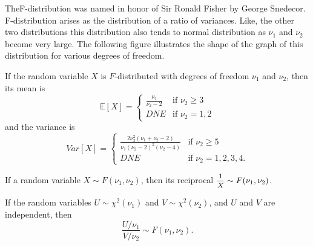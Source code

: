 TheF-distribution was named in honor of Sir Ronald Fisher by George
Snedecor. F-distribution arises as the distribution of a ratio of variances.
Like, the other two distributions this distribution also tends to normal 
distribution as $\nu_1$ and $\nu_2$ become very large. The
following figure illustrates the
 shape of the graph of this distribution for various degrees of freedom.

\begin{theorem}
If the random variable $X$ is $F$-distributed with degrees 
of freedom $\nu_1$ and $\nu_2$, then its mean is 
\begin{equation}
    \mathbb{E}[X] = \begin{cases}
        \displaystyle \frac{\nu_2}{\nu_2 - 2} & \text{if } \nu_2 \geq 3\\
        DNE & \text{if } \nu_2 = 1,2
    \end{cases}
\end{equation}
and the variance is 
\begin{equation}
    Var[X] = \begin{cases}
        \displaystyle \frac{2\nu^2_2 (\nu_1 + \nu_2 - 2)}{\nu_1 (\nu_2 - 2)^2 (\nu_2 - 4)} & \text{if } \nu_2 \geq 5\\
        DNE & \text{if } \nu_2 = 1,2,3,4.
    \end{cases}
\end{equation}
\end{theorem}

\begin{theorem}
    If a random variable $X \sim F(\nu_1, \nu_2)$, then its reciprocal $\mfrac{1}{X} \sim F(\nu_1, \nu_2)$.
\end{theorem}

\begin{theorem}
    If the random variables $U \sim \chi^2(\nu_1)$ and $V \sim \chi^2(\nu_2)$, and 
    $U$ and $V$ are independent, then 
    \begin{equation}
        \frac{U/\nu_1}{V/\nu_2} \sim F(\nu_1, \nu_2).
    \end{equation}
\end{theorem}

